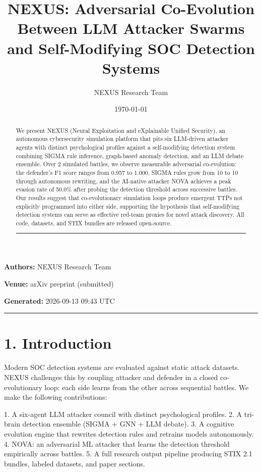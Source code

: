 \documentclass{article}
\title{NEXUS: Adversarial Co-Evolution Between LLM Attacker Swarms and Self-Modifying SOC Detection Systems}
\author{NEXUS Research Team}
\date{\today}
\begin{document}
\maketitle


\textbf{Authors:} NEXUS Research Team  

\textbf{Venue:} arXiv preprint (submitted)  

\textbf{Generated:} 2026-09-13 09:43 UTC  

\hrule\vspace{6pt}

\begin{abstract}

We present NEXUS (Neural Exploitation and eXplainable Unified Security), an autonomous cybersecurity simulation platform that pits six LLM-driven attacker agents with distinct psychological profiles against a self-modifying detection system combining SIGMA rule inference, graph-based anomaly detection, and an LLM debate ensemble. Over 2 simulated battles, we observe measurable adversarial co-evolution: the defender's F1 score ranges from 0.957 to 1.000, SIGMA rules grow from 10 to 10 through autonomous rewriting, and the AI-native attacker NOVA achieves a peak evasion rate of 50.0\% after probing the detection threshold across successive battles. Our results suggest that co-evolutionary simulation loops produce emergent TTPs not explicitly programmed into either side, supporting the hypothesis that self-modifying detection systems can serve as effective red-team proxies for novel attack discovery. All code, datasets, and STIX bundles are released open-source.


\hrule\vspace{6pt}

\end{abstract}

\section{1. Introduction}

Modern SOC detection systems are evaluated against static attack datasets. NEXUS challenges this by coupling attacker and defender in a closed co-evolutionary loop: each side learns from the other across sequential battles. We make the following contributions:

1. A six-agent LLM attacker council with distinct psychological profiles.
2. A tri-brain detection ensemble (SIGMA + GNN + LLM debate).
3. A cognitive evolution engine that rewrites detection rules and retrains models autonomously.
4. NOVA: an adversarial ML attacker that learns the detection threshold empirically across battles.
5. A full research output pipeline producing STIX 2.1 bundles, labeled datasets, and paper sections.
\end{document}
